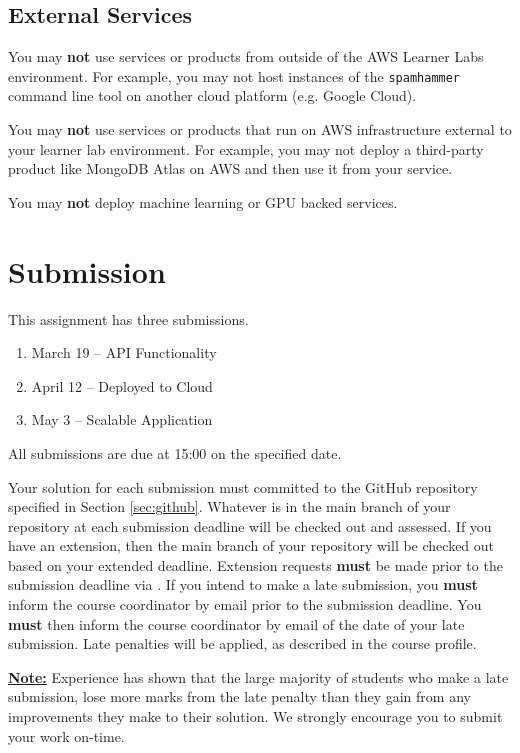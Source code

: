 \documentclass{csse4400}
\begin{document}
\subsection{External Services}
You may \textbf{not} use services or products from outside of the AWS Learner Labs environment.
For example, you may not host instances of the \texttt{spamhammer} command line tool on another cloud platform
(e.g. Google Cloud).

You may \textbf{not} use services or products that run on AWS infrastructure external to your learner lab environment.
For example, you may not deploy a third-party product like MongoDB Atlas on AWS and then use it from your service.

You may \textbf{not} deploy machine learning or GPU backed services.

\section{Submission}
This assignment has three submissions.

\begin{enumerate}
  \item March 19 -- API Functionality
  \item April 12 -- Deployed to Cloud
  \item May 3 -- Scalable Application
\end{enumerate}
All submissions are due at 15:00 on the specified date.

Your solution for each submission must committed to the GitHub repository specified in Section \ref{sec:github}.
Whatever is in the main branch of your repository at each submission deadline will be checked out and assessed.
If you have an extension, then the main branch of your repository will be checked out based on your extended deadline.
Extension requests \textbf{must} be made prior to the submission deadline via .
If you intend to make a late submission, you \textbf{must} inform the course coordinator by email prior to the submission deadline.
You \textbf{must} then inform the course coordinator by email of the date of your late submission.
Late penalties will be applied, as described in the course profile.

\textbf{\underline{Note:}} Experience has shown that the large majority of students who make a late submission,
lose more marks from the late penalty than they gain from any improvements they make to their solution.
We strongly encourage you to submit your work on-time.
\end{document}
